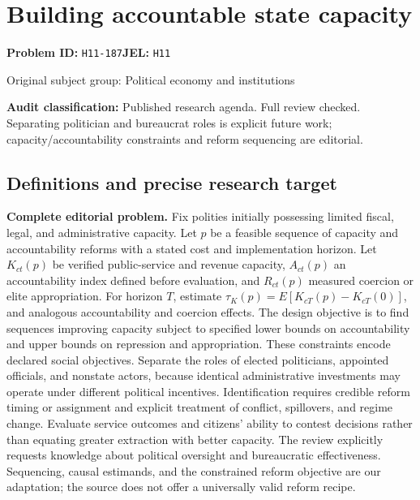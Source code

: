 \documentclass[11pt,a4paper]{article}
\begin{document}
\section*{Building accountable state capacity}
\textbf{Problem ID:} \texttt{H11-187}\quad \textbf{JEL:} \texttt{H11}\par
\label{problem:OP-0381}
{\sffamily\small\color{muted}Original subject group: Political economy and institutions\par}
\label{definitions:problem:30007663}
\textbf{Audit classification:} Published research agenda. Full review checked. Separating politician and bureaucrat roles is explicit future work; capacity/accountability constraints and reform sequencing are editorial.
\subsection*{Definitions and precise research target}
\textbf{Complete editorial problem.} Fix polities initially possessing limited fiscal, legal, and administrative capacity. Let \(p\) be a feasible sequence of capacity and accountability reforms with a stated cost and implementation horizon. Let \(K_{ct}(p)\) be verified public-service and revenue capacity, \(A_{ct}(p)\) an accountability index defined before evaluation, and \(R_{ct}(p)\) measured coercion or elite appropriation. For horizon \(T\), estimate \(\tau_K(p)=E[K_{cT}(p)-K_{cT}(0)]\), and analogous accountability and coercion effects. The design objective is to find sequences improving capacity subject to specified lower bounds on accountability and upper bounds on repression and appropriation. These constraints encode declared social objectives. Separate the roles of elected politicians, appointed officials, and nonstate actors, because identical administrative investments may operate under different political incentives. Identification requires credible reform timing or assignment and explicit treatment of conflict, spillovers, and regime change. Evaluate service outcomes and citizens' ability to contest decisions rather than equating greater extraction with better capacity. The review explicitly requests knowledge about political oversight and bureaucratic effectiveness. Sequencing, causal estimands, and the constrained reform objective are our adaptation; the source does not offer a universally valid reform recipe.
\end{document}
